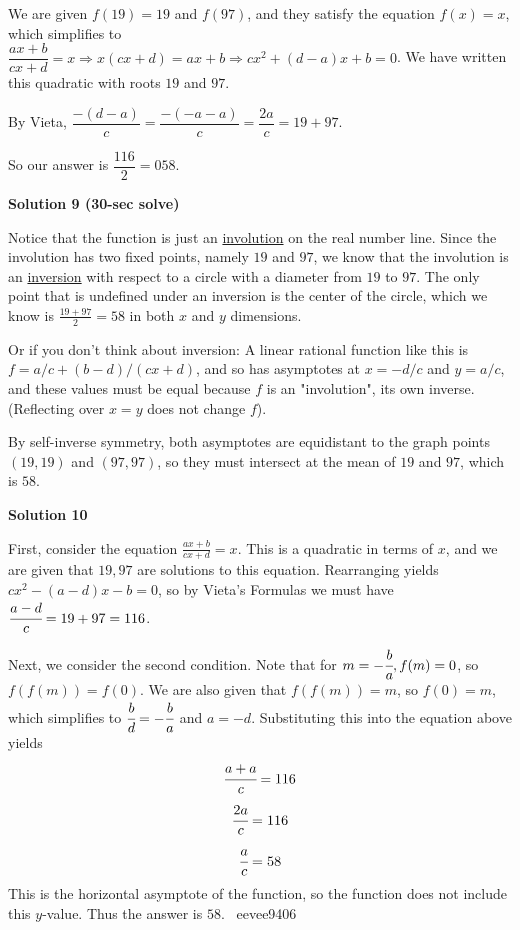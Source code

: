 \begin{enumerate}
 We are given $f(19)=19$ and $f(97)$, and they satisfy the equation $f(x)=x$, which simplifies to $\dfrac{ax+b}{cx+d}=x\Rightarrow x(cx+d)=ax+b\Rightarrow cx^2+(d-a)x+b=0$. We have written this quadratic with roots $19$ and $97$. 

 By Vieta, $\dfrac{-(d-a)}{c}=\dfrac{-(-a-a)}{c}=\dfrac{2a}{c}=19+97$.

 So our answer is $\dfrac{116}{2}=\boxed{058}$.

 



\textbf{Solution 9 (30-sec solve)}

Notice that the function is just an \href{https://artofproblemsolving.com/wiki/index.php?title=Involution}{involution} on the real number line. Since the involution has two fixed points, namely $19$ and $97$, we know that the involution is an \href{https://artofproblemsolving.com/wiki/index.php?title=Circular\_inversion}{inversion} with respect to a circle with a diameter from $19$ to $97$. The only point that is undefined under an inversion is the center of the circle, which we know is $\frac{19+97}{2}=\boxed{58}$ in both $x$ and $y$ dimensions.

 
Or if you don't think about inversion: A linear rational function like this is $f= a/c + (b-d)/(cx+d)$, and so has asymptotes at $x=-d/c$ and $y=a/c$, and these values must be equal because $f$ is an "involution", its own inverse. (Reflecting over $x=y$ does not change $f$). 

 By self-inverse symmetry, both asymptotes are equidistant to the graph points $(19,19)$ and $(97,97)$, so they must intersect at the mean of $19$ and $97$, which is $58$.

 



\textbf{Solution 10}

First, consider the equation $\frac{ax+b}{cx+d}=x$. This is a quadratic in terms of $x$, and we are given that $19,97$ are solutions to this equation. Rearranging yields $cx^2-(a-d)x-b=0$, so by Vieta’s Formulas we must have $\cfrac{a-d}{c}=19+97=116$.

 Next, we consider the second condition. Note that for $m=-\cfrac{b}{a},f(m)=0$, so $f(f(m))=f(0)$. We are also given that $f(f(m))=m$, so $f(0)=m$, which simplifies to $\cfrac{b}{d}=-\cfrac{b}{a}$ and $a=-d$. Substituting this into the equation above yields
 \[\cfrac{a+a}{c}=116\]
 \[\cfrac{2a}{c}=116\]
 \[\cfrac{a}{c}=58\]This is the horizontal asymptote of the function, so the function does not include this $y$-value. Thus the answer is $\boxed{58}$. ~eevee9406


\end{enumerate}
